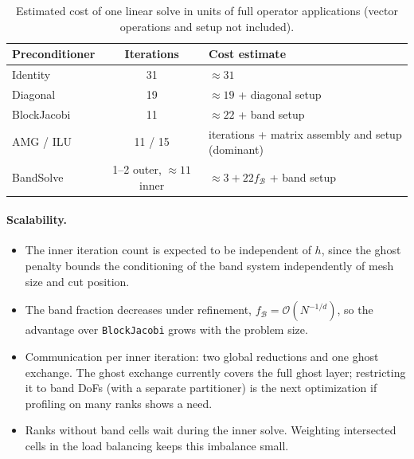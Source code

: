 \documentclass[11pt,a4paper]{article}
\newcommand{\B}{\mathcal{B}}
\newcommand{\param}[1]{\texttt{#1}}
\begin{document}
\begin{table}[htb]
  \centering
  \caption{Estimated cost of one linear solve in units of full operator applications (vector
    operations and setup not included).}
  \label{tab:cost}
  \begin{tabular}{@{}lcl@{}}
    \toprule
    Preconditioner & Iterations & Cost estimate \\
    \midrule
    Identity    & 31 & $\approx 31$ \\
    Diagonal    & 19 & $\approx 19$ + diagonal setup \\
    BlockJacobi & 11 & $\approx 22$ + band setup \\
    AMG / ILU   & 11 / 15 & iterations + matrix assembly and setup (dominant) \\
    BandSolve   & 1--2 outer, $\approx 11$ inner & $\approx 3 + 22 f_\B$ + band setup \\
    \bottomrule
  \end{tabular}
\end{table}

\paragraph{Scalability.}
\begin{itemize}[leftmargin=*]
  \item The inner iteration count is expected to be independent of $h$, since the ghost penalty
        bounds the conditioning of the band system independently of mesh size and cut position.
  \item The band fraction decreases under refinement, $f_\B = \mathcal{O}(N^{-1/d})$, so the
        advantage over \param{BlockJacobi} grows with the problem size.
  \item Communication per inner iteration: two global reductions and one ghost exchange. The ghost
        exchange currently covers the full ghost layer; restricting it to band DoFs (with a separate
        partitioner) is the next optimization if profiling on many ranks shows a need.
  \item Ranks without band cells wait during the inner solve. Weighting intersected cells in the
        load balancing keeps this imbalance small.
\end{itemize}
\end{document}
